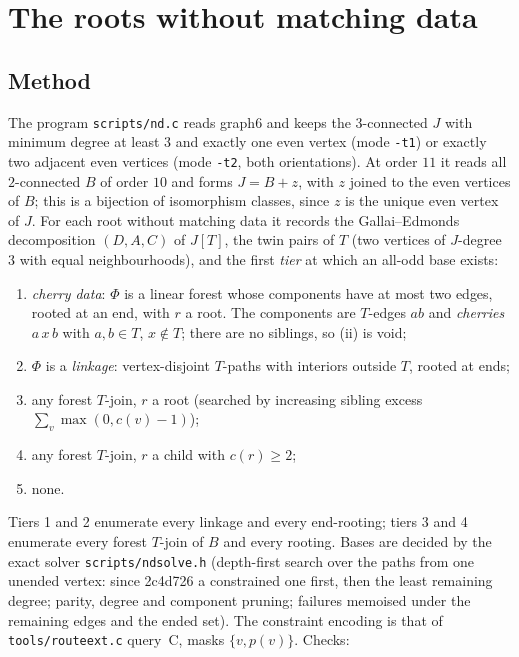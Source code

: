 \documentclass[11pt]{amsart}
\theoremstyle{definition}
\theoremstyle{remark}
\renewcommand{\_}{\oldunderscore\allowbreak}
\begin{document}
\section{The roots without matching data}\label{sec:data}

\subsection{Method}
The program \texttt{scripts/nd.c} reads graph6 and keeps the $3$-connected $J$ with minimum degree
at least $3$ and exactly one even vertex (mode \texttt{-t1}) or exactly two adjacent even vertices
(mode \texttt{-t2}, both orientations). At order $11$ it reads all $2$-connected $B$ of order $10$
and forms $J=B+z$, with $z$ joined to the even vertices of $B$; this is a bijection of isomorphism
classes, since $z$ is the unique even vertex of $J$. For each root without matching data it
records the Gallai--Edmonds decomposition $(D,A,C)$ of $J[T]$, the twin pairs of $T$ (two vertices
of $J$-degree $3$ with equal neighbourhoods), and the first \emph{tier} at which an all-odd base
exists:
\begin{enumerate}[label=\arabic*.]
\item \emph{cherry data}: $\Phi$ is a linear forest whose components have at most two edges, rooted
at an end, with $r$ a root. The components are $T$-edges $ab$ and \emph{cherries} $a\,x\,b$ with
$a,b\in T$, $x\notin T$; there are no siblings, so (ii) is void;
\item $\Phi$ is a \emph{linkage}: vertex-disjoint $T$-paths with interiors outside $T$, rooted at
ends;
\item any forest $T$-join, $r$ a root (searched by increasing sibling excess
$\sum_v\max(0,c(v)-1)$);
\item any forest $T$-join, $r$ a child with $c(r)\ge2$;
\item none.
\end{enumerate}
Tiers 1 and 2 enumerate every linkage and every end-rooting; tiers 3 and 4 enumerate every forest
$T$-join of $B$ and every rooting. Bases are decided by the exact solver \texttt{scripts/ndsolve.h}
(depth-first search over the paths from one unended vertex: since 2c4d726 a constrained one first,
then the least remaining degree; parity, degree and
component pruning; failures memoised under the remaining edges and the ended set). The constraint
encoding is that of \texttt{tools/route\_ext.c} query~C, masks $\{v,p(v)\}$. Checks:
\end{document}
